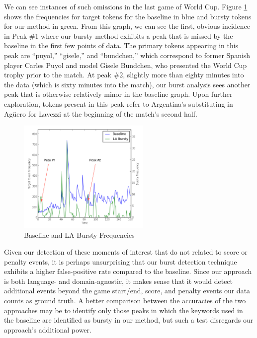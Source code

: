 \documentclass{sig-alternate}
\begin{document}
We can see instances of such omissions in the last game of World Cup.
Figure \ref{fig:worldCupFreqs} shows the frequencies for target tokens for the baseline in blue and bursty tokens for our method in green.
From this graph, we can see the first, obvious incidence in Peak \#1 where our bursty method exhibits a peak that is missed by the baseline in the first few points of data.
The primary tokens appearing in this peak are ``puyol,'' ``gisele,'' and ``bundchen,'' which correspond to former Spanish player Carles Puyol and model Gisele Bundchen, who presented the World Cup trophy prior to the match.
At peak \#2, slightly more than eighty minutes into the data (which is sixty minutes into the match), our burst analysis sees another peak that is otherwise relatively minor in the baseline graph.
Upon further exploration, tokens present in this peak refer to Argentina's substituting in Ag\"{u}ero for Lavezzi at the beginning of the match's second half.

\begin{figure}[hbtp]
\begin{center}
\includegraphics[width=2.5in]{./figures/wc0713freq-labeled.png}
\caption{Baseline and LA Bursty Frequencies}
\label{fig:worldCupFreqs}
\end{center}
\end{figure}

Given our detection of these moments of interest that do not related to score or penalty events, it is perhaps unsurprising that our burst detection technique exhibits a higher false-positive rate compared to the baseline.
Since our approach is both language- and domain-agnostic, it makes sense that it would detect additional events beyond the game start/end, score, and penalty events our data counts as ground truth.
A better comparison between the accuracies of the two approaches may be to identify only those peaks in which the keywords used in the baseline are identified as bursty in our method, but such a test disregards our approach's additional power.
\end{document}

